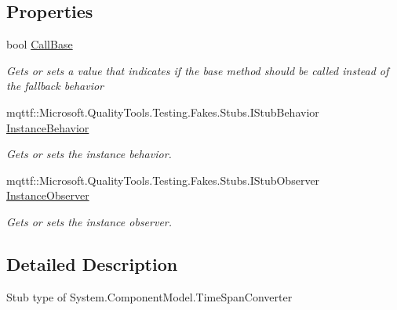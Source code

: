 \subsection*{Properties}
\begin{DoxyCompactItemize}
\item 
bool \hyperlink{class_system_1_1_component_model_1_1_fakes_1_1_stub_time_span_converter_a80820555cfcc31968d983e094905d120}{Call\-Base}
\begin{DoxyCompactList}\small\item\em Gets or sets a value that indicates if the base method should be called instead of the fallback behavior\end{DoxyCompactList}\item 
mqttf\-::\-Microsoft.\-Quality\-Tools.\-Testing.\-Fakes.\-Stubs.\-I\-Stub\-Behavior \hyperlink{class_system_1_1_component_model_1_1_fakes_1_1_stub_time_span_converter_a845c76dc8e6d5c7477f9f3c482f76efc}{Instance\-Behavior}
\begin{DoxyCompactList}\small\item\em Gets or sets the instance behavior.\end{DoxyCompactList}\item 
mqttf\-::\-Microsoft.\-Quality\-Tools.\-Testing.\-Fakes.\-Stubs.\-I\-Stub\-Observer \hyperlink{class_system_1_1_component_model_1_1_fakes_1_1_stub_time_span_converter_a0dbfcc7bd674bacdc7de551759db739d}{Instance\-Observer}
\begin{DoxyCompactList}\small\item\em Gets or sets the instance observer.\end{DoxyCompactList}\end{DoxyCompactItemize}


\subsection{Detailed Description}
Stub type of System.\-Component\-Model.\-Time\-Span\-Converter



